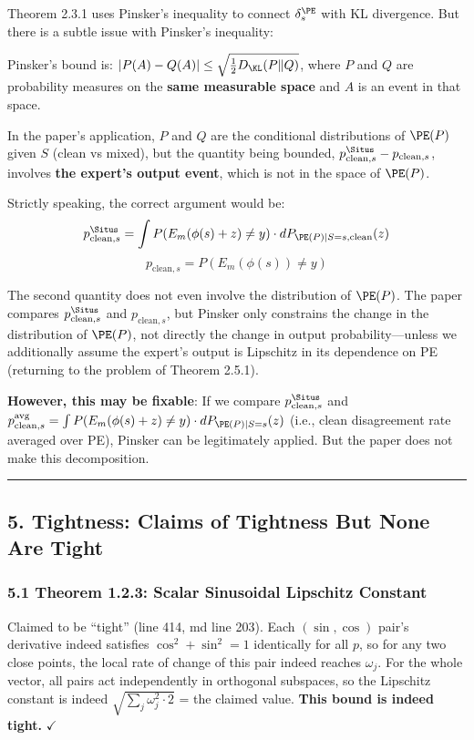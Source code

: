 \documentclass[
  12pt,
]{article}
\begin{document}
Theorem 2.3.1 uses Pinsker's inequality to connect \(\delta_s^{\PE}\) with KL divergence. But there is a subtle issue with Pinsker's inequality:

Pinsker's bound is: \(|P(A) - Q(A)| \leq \sqrt{\frac{1}{2}D_{\KL}(P\|Q)}\), where \(P\) and \(Q\) are probability measures on the \textbf{same measurable space} and \(A\) is an event in that space.

In the paper's application, \(P\) and \(Q\) are the conditional distributions of \(\PE(P)\) given \(S\) (clean vs mixed), but the quantity being bounded, \(p_{\text{clean},s}^{\Situs} - p_{\text{clean},s}\), involves \textbf{the expert's output event}, which is not in the space of \(\PE(P)\).

Strictly speaking, the correct argument would be:
\[p_{\text{clean},s}^{\Situs} = \int P(E_m(\phi(s)+z) \neq y) \cdot dP_{\PE(P)|S=s,\text{clean}}(z)\]
\[p_{\text{clean},s} = P(E_m(\phi(s)) \neq y)\]

The second quantity does not even involve the distribution of \(\PE(P)\). The paper compares \(p_{\text{clean},s}^{\Situs}\) and \(p_{\text{clean},s}\), but Pinsker only constrains the change in the distribution of \(\PE(P)\), not directly the change in output probability---unless we additionally assume the expert's output is Lipschitz in its dependence on PE (returning to the problem of Theorem 2.5.1).

\textbf{However, this may be fixable}: If we compare \(p_{\text{clean},s}^{\Situs}\) and \(p_{\text{clean},s}^{\text{avg}} = \int P(E_m(\phi(s)+z) \neq y) \cdot dP_{\PE(P)|S=s}(z)\) (i.e., clean disagreement rate averaged over PE), Pinsker can be legitimately applied. But the paper does not make this decomposition.

\begin{center}\rule{0.5\linewidth}{0.5pt}\end{center}

\subsection{5. Tightness: Claims of Tightness But None Are Tight}\label{tightness}

\subsubsection{5.1 Theorem 1.2.3: Scalar Sinusoidal Lipschitz Constant}\label{theorem-123-tight}

Claimed to be ``tight'' (line 414, md line 203). Each \((\sin,\cos)\) pair's derivative indeed satisfies \(\cos^2 + \sin^2 = 1\) identically for all \(p\), so for any two close points, the local rate of change of this pair indeed reaches \(\omega_j\). For the whole vector, all pairs act independently in orthogonal subspaces, so the Lipschitz constant is indeed \(\sqrt{\sum_j \omega_j^2 \cdot 2}\) = the claimed value. \textbf{This bound is indeed tight.} $\checkmark$
\end{document}
